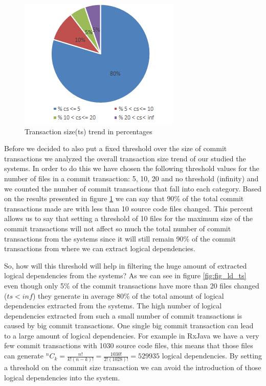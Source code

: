 \documentclass[conference]{IEEEtran}
\newcommand*{\Comb}[2]{{}^{#1}C_{#2}}%
\begin{document}
\begin{figure}[h]
\includegraphics[scale=0.9]{fig_cs.png}
\caption{Transaction size(ts) trend in percentages}
\label{fig:fig_cs}
\centering
\end{figure}

Before we decided to also put a fixed threshold over the size of commit transactions we analyzed the overall transaction size trend of our studied the systems.
In order to do this we have chosen the following threshold values for the number of files in a commit transaction: 5, 10, 20 and no threshold (infinity) and we counted the number of commit transactions that fall into each category.
Based on the results presented in figure \ref{fig:fig_cs} we can say that 90\% of the total commit transactions made are with less than 10 source code files changed. This percent allows us to say that setting a threshold of 10 files for the maximum size of the commit transactions will not affect so much the total number of commit transactions from the systems since it will still remain 90\% of the commit transactions from where we can extract logical dependencies.

So, how will this threshold will help in filtering the huge amount of extracted logical dependencies from the systems?
As we can see in figure \ref{fig:fig_ld_ts} even though only 5\% of the commit transactions have more than 20 files changed ($ts<inf$) they generate in average 80\% of the total amount of logical dependencies extracted from the systems.
The high number of logical dependencies extracted from such a small number of commit transactions is caused by big commit transactions. 
One single big commit transaction can lead to a large amount of logical dependencies. For example in RxJava we have a very few commit transactions with 1030 source code files, this means that those files can generate 
$\Comb{n}{k}=\frac{n!}{k!(n-k)!} = \frac{1030!}{2!(1028)!} = 529 935$ logical dependencies. By setting a threshold on the commit size transaction we can avoid the introduction of those logical dependencies into the system.
\end{document}
